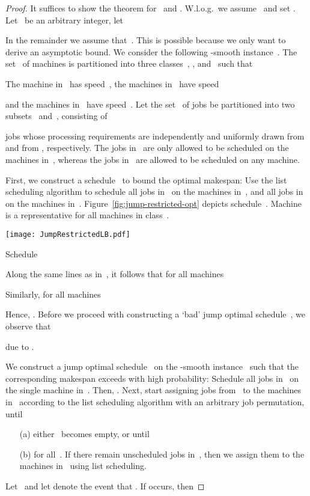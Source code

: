 \documentclass[a4paper,11pt,fleqn]{article}
\begin{document}
\begin{proof}
It suffices to show the theorem for~ and . W.l.o.g.\ we
assume~ and set . Let~ be an
arbitrary integer, let

In the remainder we assume
that~. This is possible because we only want to derive
an asymptotic bound. We consider the following -smooth
instance~. The set~ of machines is partitioned into three
classes~, , and~ such that

The machine in~ has speed~, the
machines in~ have speed

and the machines in~ have speed~. Let the set~ of jobs be
partitioned into two subsets~ and~, consisting of

jobs whose processing requirements are independently and uniformly drawn from
 and from , respectively. The jobs in~
are only allowed to be scheduled on the machines in~, whereas the
jobs in~ are allowed to be scheduled on any machine.

First, we construct a schedule~ to bound the optimal makespan: Use the
list scheduling algorithm to schedule all jobs in~ on the machines in~, and all jobs
in~  on the machines in~. Figure~\ref{fig:jump-restricted-opt} depicts schedule~. Machine~ is a representative for all machines in class~.

\begin{artclfig}\newcommand{\height}{12em}
  \texttt{[image: JumpRestrictedLB.pdf]}
  \caption{Schedule~}
  \label{fig:jump-restricted-opt}
\end{artclfig}

Along the same lines as in~\cite{graham:1966}, it follows that for all machines~

Similarly,  for all machines~


Hence, . Before we proceed with
constructing a `bad' jump optimal schedule~, we observe that

due to .

We construct a jump optimal schedule~ on the -smooth
instance~ such that the corresponding makespan exceeds  with
high probability: Schedule all jobs in~ on the single machine
in~. Then, . Next, start assigning jobs
from~ to the machines in~ according to the list scheduling
algorithm with an arbitrary job permutation, until
\begin{itemize}
\item[(a)] either~ becomes empty, or until
\item[(b)]  for all~. If
there remain unscheduled jobs in~, then we assign them to
the machines in~ using list scheduling.
\end{itemize}
Let~ and let  denote the event that 
. If  occurs, then


\end{proof}
\end{document}
